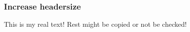 \subsubsection{Increase headersize} \label{subsubsection:counter-reengineering-break-headersize}
This is my real text! Rest might be copied or not be checked!
